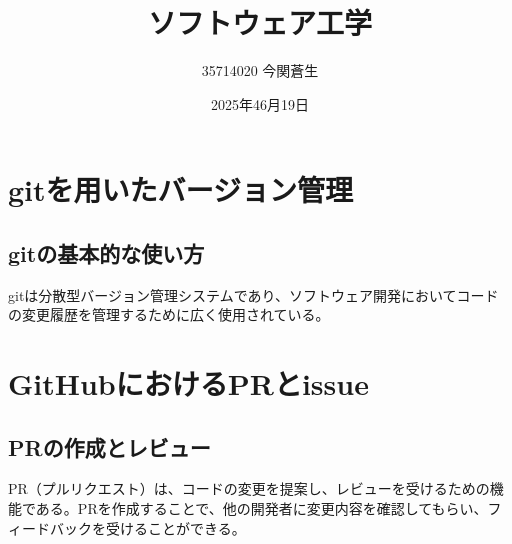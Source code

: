 \documentclass[a4paper,11pt]{ltjsarticle}
\title{ソフトウェア工学}
\author{35714020 今関蒼生}
\date{2025年46月19日}
\begin{document}
\maketitle
%
%
\section{gitを用いたバージョン管理}
\subsection{gitの基本的な使い方}
gitは分散型バージョン管理システムであり、ソフトウェア開発においてコードの変更履歴を管理するために広く使用されている。

\section{GitHubにおけるPRとissue}
\subsection{PRの作成とレビュー}
PR（プルリクエスト）は、コードの変更を提案し、レビューを受けるための機能である。PRを作成することで、他の開発者に変更内容を確認してもらい、フィードバックを受けることができる。
\end{document}

